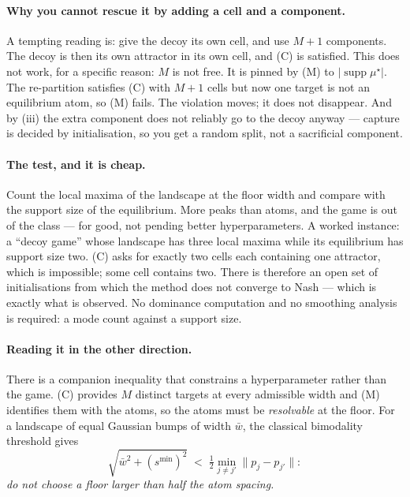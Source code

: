 \documentclass[11pt]{article}
\theoremstyle{definition}
\DeclareMathOperator{\supp}{supp}
\begin{document}
\paragraph{Why you cannot rescue it by adding a cell and a component.} A tempting
reading is: give the decoy its own cell, and use $M+1$ components. The decoy is
then its own attractor in its own cell, and (C) is satisfied. This does not work,
for a specific reason: $M$ is not free. It is pinned by (M) to
$|\supp \mu^\star|$. The re-partition satisfies (C) with $M+1$ cells but now one
target is not an equilibrium atom, so (M) fails. The violation moves; it does not
disappear. And by (iii) the extra component does not reliably go to the decoy
anyway --- capture is decided by initialisation, so you get a random split, not a
sacrificial component.

\paragraph{The test, and it is cheap.} Count the local maxima of the landscape at
the floor width and compare with the support size of the equilibrium. More peaks
than atoms, and the game is out of the class --- for good, not pending better
hyperparameters. A worked instance: a ``decoy game'' whose landscape has three
local maxima while its equilibrium has support size two. (C) asks for exactly two
cells each containing one attractor, which is impossible; some cell contains two.
There is therefore an open set of initialisations from which the method does not
converge to Nash --- which is exactly what is observed. No dominance computation
and no smoothing analysis is required: a mode count against a support size.

\paragraph{Reading it in the other direction.} There is a companion inequality
that constrains a hyperparameter rather than the game. (C) provides $M$ distinct
targets at every admissible width and (M) identifies them with the atoms, so the
atoms must be \emph{resolvable} at the floor. For a landscape of equal Gaussian
bumps of width $\bar w$, the classical bimodality threshold gives
\begin{equation}\label{eq:resolution}
  \sqrt{\bar w^2 + (s^{\min})^2} \;<\; \tfrac12 \min_{j \ne j'}\|p_j - p_{j'}\| :
\end{equation}
\emph{do not choose a floor larger than half the atom spacing.}
\end{document}
